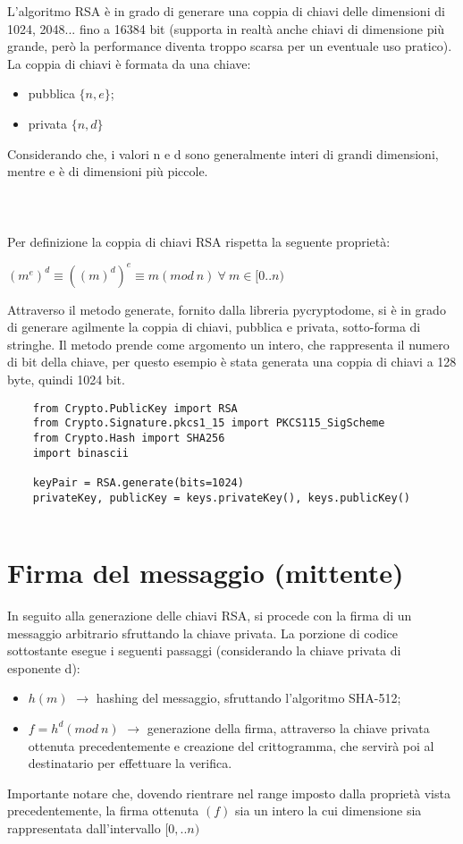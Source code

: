 L'algoritmo RSA è in grado di generare una coppia di chiavi delle dimensioni di 1024, 2048... fino a 16384 bit (supporta in realtà anche chiavi di dimensione più grande, però la performance diventa troppo scarsa per un eventuale uso pratico). La coppia di chiavi è formata da una chiave:
\begin{itemize}
	\item pubblica $\{n, e\}$;
	\item privata $\{n, d\}$
\end{itemize}
Considerando che, i valori n e d sono generalmente interi di grandi dimensioni, mentre e è di dimensioni più piccole. \\ \\ \\ \\
Per definizione la coppia di chiavi RSA rispetta la seguente proprietà: 
\begin{center}
	$(m^{e})^{d} \equiv ((m)^{d})^{e} \equiv m (mod \: n) \: \forall \: m \in [0..n)$
\end{center} 
Attraverso il metodo generate, fornito dalla libreria pycryptodome, si è in grado di generare agilmente la coppia di chiavi, pubblica e privata, sotto-forma di stringhe. Il metodo prende come argomento un intero, che rappresenta il numero di bit della chiave, per questo esempio è stata generata una coppia di chiavi a 128 byte, quindi 1024 bit.

\begin{lstlisting}
	from Crypto.PublicKey import RSA
	from Crypto.Signature.pkcs1_15 import PKCS115_SigScheme
	from Crypto.Hash import SHA256
	import binascii
	
	keyPair = RSA.generate(bits=1024)
	privateKey, publicKey = keys.privateKey(), keys.publicKey()
	
\end{lstlisting}

\section{Firma del messaggio (mittente)}

In seguito alla generazione delle chiavi RSA, si procede con la firma di un messaggio arbitrario sfruttando la chiave privata. La porzione di codice sottostante esegue i seguenti passaggi (considerando la chiave privata di esponente d):
\begin{itemize}
	\item $h(m)$ $\rightarrow$ hashing del messaggio, sfruttando l'algoritmo SHA-512;
	\item $f = h^d (mod \: n)$ $\rightarrow$ generazione della firma, attraverso la chiave privata ottenuta precedentemente e creazione del crittogramma, che servirà poi al destinatario per effettuare la verifica.
\end{itemize}
Importante notare che, dovendo rientrare nel range imposto dalla proprietà vista precedentemente, la firma ottenuta $(f)$ sia un intero la cui dimensione sia rappresentata dall'intervallo $[0,..n)$

